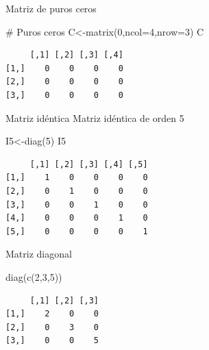 \documentclass[
  ignorenonframetext,
  aspectratio=169,
  spanish,
]{beamer}
\newenvironment{Shaded}{\begin{snugshade}}{\end{snugshade}}
\newcommand{\AttributeTok}[1]{\textcolor[rgb]{0.40,0.45,0.13}{#1}}
\newcommand{\CommentTok}[1]{\textcolor[rgb]{0.37,0.37,0.37}{#1}}
\newcommand{\DecValTok}[1]{\textcolor[rgb]{0.68,0.00,0.00}{#1}}
\newcommand{\FunctionTok}[1]{\textcolor[rgb]{0.28,0.35,0.67}{#1}}
\newcommand{\NormalTok}[1]{\textcolor[rgb]{0.00,0.23,0.31}{#1}}
\newcommand{\OtherTok}[1]{\textcolor[rgb]{0.00,0.23,0.31}{#1}}
\begin{document}
\begin{frame}[fragile]{Matriz de puros ceros}
\label{matriz-de-puros-ceros}
\begin{Shaded}
\begin{Highlighting}[]
\CommentTok{\# Puros ceros }
\NormalTok{C}\OtherTok{\textless{}{-}}\FunctionTok{matrix}\NormalTok{(}\DecValTok{0}\NormalTok{,}\AttributeTok{ncol=}\DecValTok{4}\NormalTok{,}\AttributeTok{nrow=}\DecValTok{3}\NormalTok{)}
\NormalTok{C}
\end{Highlighting}
\end{Shaded}

\begin{verbatim}
     [,1] [,2] [,3] [,4]
[1,]    0    0    0    0
[2,]    0    0    0    0
[3,]    0    0    0    0
\end{verbatim}
\end{frame}

\begin{frame}[fragile]{Matriz idéntica}
\label{matriz-iduxe9ntica}
Matriz idéntica de orden 5

\begin{Shaded}
\begin{Highlighting}[]
\NormalTok{I5}\OtherTok{\textless{}{-}}\FunctionTok{diag}\NormalTok{(}\DecValTok{5}\NormalTok{)}
\NormalTok{I5}
\end{Highlighting}
\end{Shaded}

\begin{verbatim}
     [,1] [,2] [,3] [,4] [,5]
[1,]    1    0    0    0    0
[2,]    0    1    0    0    0
[3,]    0    0    1    0    0
[4,]    0    0    0    1    0
[5,]    0    0    0    0    1
\end{verbatim}
\end{frame}

\begin{frame}[fragile]{Matriz diagonal}
\label{matriz-diagonal}
\begin{Shaded}
\begin{Highlighting}[]
\FunctionTok{diag}\NormalTok{(}\FunctionTok{c}\NormalTok{(}\DecValTok{2}\NormalTok{,}\DecValTok{3}\NormalTok{,}\DecValTok{5}\NormalTok{))}
\end{Highlighting}
\end{Shaded}

\begin{verbatim}
     [,1] [,2] [,3]
[1,]    2    0    0
[2,]    0    3    0
[3,]    0    0    5
\end{verbatim}
\end{frame}
\end{document}
